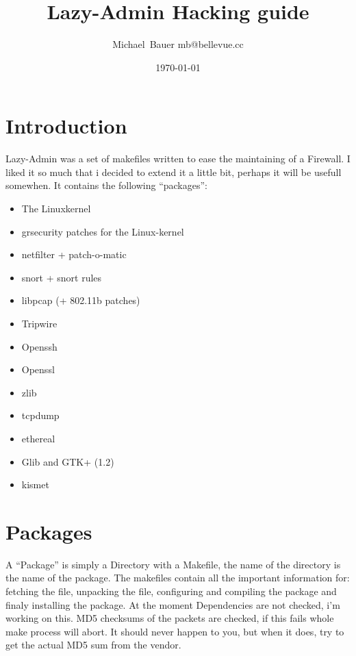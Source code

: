 \documentclass[11pt,a4paper]{article}
\date{\today}
\author{Michael~Bauer mb@bellevue.cc}
\title{Lazy-Admin Hacking guide}
\begin{document}
\maketitle
\section{Introduction}
Lazy-Admin was a set of makefiles written to ease the maintaining of a Firewall. I liked it so much that i decided to extend it a little bit, perhaps it will be usefull somewhen. It contains the following ``packages'':
\begin{itemize}
\item The Linuxkernel
\item grsecurity patches for the Linux-kernel
\item netfilter + patch-o-matic
\item snort + snort rules
\item libpcap (+ 802.11b patches)
\item Tripwire
\item Openssh
\item Openssl
\item zlib
\item tcpdump
\item ethereal
\item Glib and GTK+ (1.2)
\item kismet
\end{itemize}

\section{Packages}
A ``Package'' is simply a Directory with a Makefile, the name of the directory is the name of the package. The makefiles contain all the important information for: fetching the file, unpacking the file, configuring and compiling the package and finaly installing the package. At the moment Dependencies are not checked, i'm working on this. MD5 checksums of the packets are checked, if this fails whole make process will abort. It should never happen to you, but when it does, try to get the actual MD5 sum from the vendor.
\end{document}
